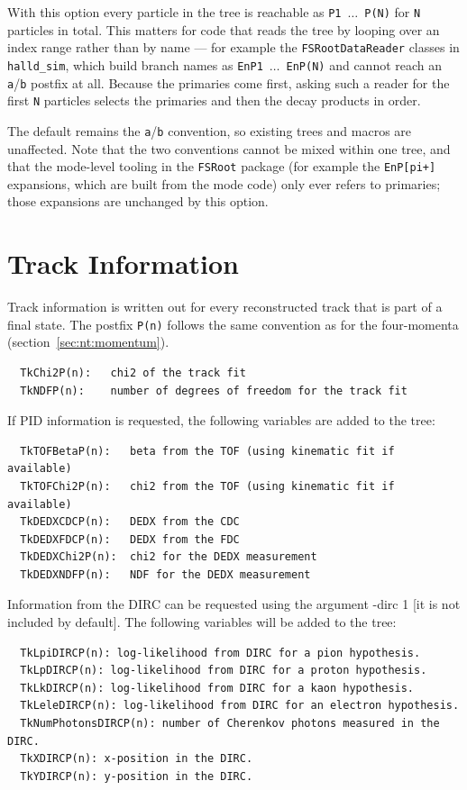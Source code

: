 \documentclass[11pt]{article}
\begin{document}
With this option every particle in the tree is reachable as {\tt P1}~$\ldots$~{\tt P(N)} for {\tt N} particles in total.  This matters for code that reads the tree by looping over an index range rather than by name --- for example the {\tt FSRootDataReader} classes in {\tt halld\_sim}, which build branch names as {\tt EnP1}~$\ldots$~{\tt EnP(N)} and cannot reach an {\tt a}/{\tt b} postfix at all.  Because the primaries come first, asking such a reader for the first {\tt N} particles selects the primaries and then the decay products in order.

The default remains the {\tt a}/{\tt b} convention, so existing trees and macros are unaffected.  Note that the two conventions cannot be mixed within one tree, and that the mode-level tooling in the {\tt FSRoot} package (for example the {\tt EnP[pi+]} expansions, which are built from the mode code) only ever refers to primaries; those expansions are unchanged by this option.




\section{Track Information}
\label{sec:nt:track}

Track information is written out for every reconstructed track that is part of a final state.  The postfix {\tt P(n)} follows the same convention as for the four-momenta (section~\ref{sec:nt:momentum}).
\begin{verbatim}
  TkChi2P(n):   chi2 of the track fit
  TkNDFP(n):    number of degrees of freedom for the track fit
\end{verbatim}

If PID information is requested, the following variables are added to the tree:
\begin{verbatim}
  TkTOFBetaP(n):   beta from the TOF (using kinematic fit if available)
  TkTOFChi2P(n):   chi2 from the TOF (using kinematic fit if available)
  TkDEDXCDCP(n):   DEDX from the CDC
  TkDEDXFDCP(n):   DEDX from the FDC
  TkDEDXChi2P(n):  chi2 for the DEDX measurement
  TkDEDXNDFP(n):   NDF for the DEDX measurement
\end{verbatim}

Information from the DIRC can be requested using the argument -dirc 1 [it is not included by default]. The following variables will be added to the tree:
\begin{verbatim}
  TkLpiDIRCP(n): log-likelihood from DIRC for a pion hypothesis.
  TkLpDIRCP(n): log-likelihood from DIRC for a proton hypothesis.
  TkLkDIRCP(n): log-likelihood from DIRC for a kaon hypothesis.
  TkLeleDIRCP(n): log-likelihood from DIRC for an electron hypothesis.
  TkNumPhotonsDIRCP(n): number of Cherenkov photons measured in the DIRC.
  TkXDIRCP(n): x-position in the DIRC.
  TkYDIRCP(n): y-position in the DIRC.
\end{verbatim}
\end{document}
